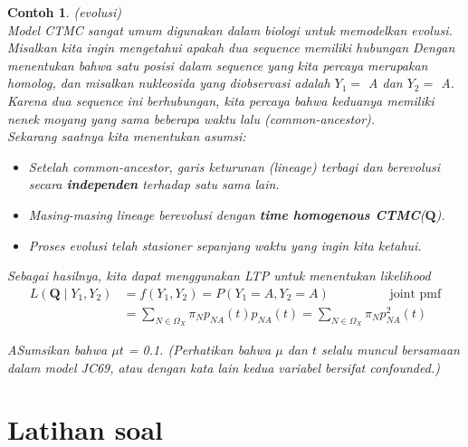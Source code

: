 \documentclass[11pt,b5paper,twoside]{book}
\newcommand{\bQ}{\boldsymbol{Q}}
\newtheorem{ex}[theorem]{Contoh}
\begin{document}
	\begin{ex} (evolusi)\\
		Model CTMC sangat umum digunakan dalam biologi untuk memodelkan evolusi. Misalkan kita ingin mengetahui apakah dua sequence memiliki hubungan Dengan menentukan bahwa satu posisi dalam sequence yang kita percaya merupakan homolog, dan misalkan nukleosida yang diobservasi adalah $Y_1 =$ A dan $Y_2=$ A. Karena dua sequence ini berhubungan, kita percaya bahwa keduanya memiliki nenek moyang yang sama beberapa waktu lalu (common-ancestor). \\
		Sekarang saatnya kita menentukan asumsi:
		\begin{itemize}
			\item [a.] Setelah common-ancestor, garis keturunan (lineage) terbagi dan berevolusi secara \textbf{independen} terhadap satu sama lain.
			
			\item [b.] Masing-masing lineage berevolusi dengan \textbf{time homogenous CTMC}($\bQ$).
			
			\item [c.] Proses evolusi telah stasioner sepanjang waktu yang ingin kita ketahui.
		\end{itemize}
		
		\noindent Sebagai hasilnya, kita dapat menggunakan LTP untuk menentukan likelihood
		\begin{equation*}
			\begin{aligned}
			L(\bQ \mid Y_1, Y_2) &= f(Y_1, Y_2)= P(Y_1 = A, Y_2 = A)  \hspace{2cm} \text{joint pmf}\\
											& = \sum_{N \in \Omega_X} \pi_N p_{NA}(t) p_{NA} (t)= \sum_{N \in \Omega_X} \pi_N p^2_{NA} (t)
			\end{aligned}
		\end{equation*}
		
		ASumsikan bahwa $\mu t$ = 0.1. (Perhatikan bahwa $\mu$ dan $t$ selalu muncul bersamaan dalam model JC69, atau dengan kata lain kedua variabel bersifat confounded.)
		
		
	\end{ex}
	
	\section*{Latihan soal} %


%
\end{document}
